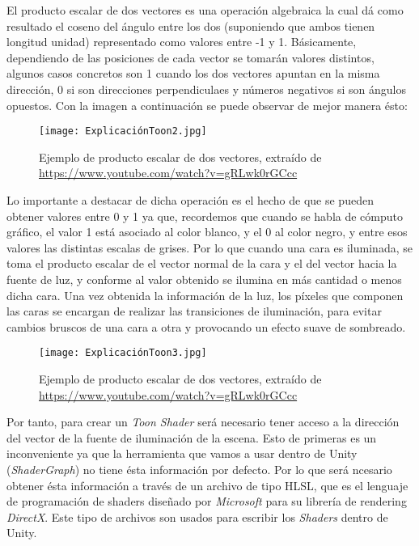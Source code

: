 El producto escalar de dos vectores es una operación algebraica la cual dá como resultado el coseno del ángulo entre los dos (suponiendo que ambos tienen longitud unidad) representado como valores entre -1 y 1. Básicamente, dependiendo de las posiciones de cada vector se tomarán valores distintos, algunos casos concretos son 1 cuando los dos vectores apuntan en la misma dirección, 0 si son direcciones perpendiculaes y números negativos si son ángulos opuestos. Con la imagen a continuación se puede observar de mejor manera ésto: 

\begin{figure}[H]
    \centering
    \texttt{[image: ExplicaciónToon2.jpg]}
    \caption{Ejemplo de producto escalar de dos vectores, extraído de \url{https://www.youtube.com/watch?v=gRLwk0rGCcc}}
\end{figure}

Lo importante a destacar de dicha operación es el hecho de que se pueden obtener valores entre 0 y 1 ya que, recordemos que cuando se habla de cómputo gráfico, el valor 1 está asociado al color blanco, y el 0 al color negro, y entre esos valores las distintas escalas de grises. Por lo que cuando una cara es iluminada, se toma el producto escalar de el vector normal de la cara y el del vector hacia la fuente de luz, y conforme al valor obtenido se ilumina en más cantidad o menos dicha cara. Una vez obtenida la información de la luz, los píxeles que componen las caras se encargan de realizar las transiciones de iluminación, para evitar cambios bruscos de una cara a otra y provocando un efecto suave de sombreado.

\begin{figure}[H]
    \centering
    \texttt{[image: ExplicaciónToon3.jpg]}
    \caption{Ejemplo de producto escalar de dos vectores, extraído de \url{https://www.youtube.com/watch?v=gRLwk0rGCcc}}
\end{figure}

Por tanto, para crear un \textit{Toon Shader} será necesario tener acceso a la dirección del vector de la fuente de iluminación de la escena. Esto de primeras es un inconveniente ya que la herramienta que vamos a usar dentro de Unity (\textit{ShaderGraph}) no tiene ésta información por defecto. Por lo que será ncesario obtener ésta información a través de un archivo de tipo HLSL, que es el lenguaje de programación de shaders diseñado por \textit{Microsoft} para su librería de rendering \textit{DirectX}. Este tipo de archivos son usados para escribir los \textit{Shaders} dentro de Unity.

